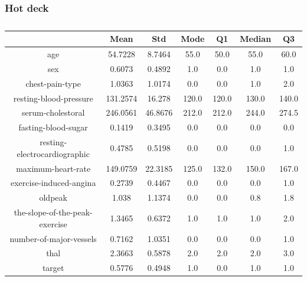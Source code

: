 \documentclass{classrep}
\begin{document}
{{            \subsubsection{Hot deck}
            \label{results:30-percent:dot-deck} {
                \begin{table}[!htbp]
                    \centering
                    \begin{tabular}{|c|c|c|c|c|c|c|}
                        \hline
                        & Mean & Std & Mode & Q1 & Median & Q3 \\ \hline
                        age & 54.7228 & 8.7464 & 55.0 & 50.0 & 55.0 & 60.0 \\ \hline
                        sex & 0.6073 & 0.4892 & 1.0 & 0.0 & 1.0 & 1.0 \\ \hline
                        chest-pain-type & 1.0363 & 1.0174 & 0.0 & 0.0 & 1.0 & 2.0 \\ \hline
                        resting-blood-pressure & 131.2574 & 16.278 & 120.0 & 120.0 & 130.0 & 140.0 \\ \hline
                        serum-cholestoral & 246.0561 & 46.8676 & 212.0 & 212.0 & 244.0 & 274.5 \\ \hline
                        fasting-blood-sugar & 0.1419 & 0.3495 & 0.0 & 0.0 & 0.0 & 0.0 \\ \hline
                        resting-electrocardiographic & 0.4785 & 0.5198 & 0.0 & 0.0 & 0.0 & 1.0 \\ \hline
                        maximum-heart-rate & 149.0759 & 22.3185 & 125.0 & 132.0 & 150.0 & 167.0 \\ \hline
                        exercise-induced-angina & 0.2739 & 0.4467 & 0.0 & 0.0 & 0.0 & 1.0 \\ \hline
                        oldpeak & 1.038 & 1.1374 & 0.0 & 0.0 & 0.8 & 1.8 \\ \hline
                        the-slope-of-the-peak-exercise & 1.3465 & 0.6372 & 1.0 & 1.0 & 1.0 & 2.0 \\ \hline
                        number-of-major-vessels & 0.7162 & 1.0351 & 0.0 & 0.0 & 0.0 & 1.0 \\ \hline
                        thal & 2.3663 & 0.5878 & 2.0 & 2.0 & 2.0 & 3.0 \\ \hline
                        target & 0.5776 & 0.4948 & 1.0 & 0.0 & 1.0 & 1.0 \\ \hline
                    \end{tabular}
                    \caption{}
                    \label{result_30_Hot-deck}
                \end{table}
                \FloatBarrier

}}}
\end{document}
